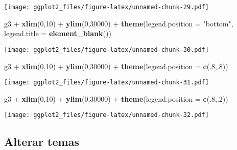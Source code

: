 \documentclass[]{article}
\newenvironment{Shaded}{\begin{snugshade}}{\end{snugshade}}
\newcommand{\KeywordTok}[1]{\textcolor[rgb]{0.13,0.29,0.53}{\textbf{{#1}}}}
\newcommand{\DataTypeTok}[1]{\textcolor[rgb]{0.13,0.29,0.53}{{#1}}}
\newcommand{\DecValTok}[1]{\textcolor[rgb]{0.00,0.00,0.81}{{#1}}}
\newcommand{\StringTok}[1]{\textcolor[rgb]{0.31,0.60,0.02}{{#1}}}
\newcommand{\NormalTok}[1]{{#1}}
\begin{document}
\texttt{[image: ggplot2\_files/figure-latex/unnamed-chunk-29.pdf]}

\newpage

\begin{Shaded}
\begin{Highlighting}[]
\NormalTok{g3 +}\StringTok{ }\KeywordTok{xlim}\NormalTok{(}\DecValTok{0}\NormalTok{,}\DecValTok{10}\NormalTok{) +}\StringTok{ }\KeywordTok{ylim}\NormalTok{(}\DecValTok{0}\NormalTok{,}\DecValTok{30000}\NormalTok{) +}\StringTok{ }\KeywordTok{theme}\NormalTok{(}\DataTypeTok{legend.position =} \StringTok{"bottom"}\NormalTok{, }\DataTypeTok{legend.title =} \KeywordTok{element_blank}\NormalTok{())}
\end{Highlighting}
\end{Shaded}

\texttt{[image: ggplot2\_files/figure-latex/unnamed-chunk-30.pdf]}

\newpage

\begin{Shaded}
\begin{Highlighting}[]
\NormalTok{g3 +}\StringTok{ }\KeywordTok{xlim}\NormalTok{(}\DecValTok{0}\NormalTok{,}\DecValTok{10}\NormalTok{) +}\StringTok{ }\KeywordTok{ylim}\NormalTok{(}\DecValTok{0}\NormalTok{,}\DecValTok{30000}\NormalTok{) +}\StringTok{ }\KeywordTok{theme}\NormalTok{(}\DataTypeTok{legend.position =} \KeywordTok{c}\NormalTok{(.}\DecValTok{8}\NormalTok{,.}\DecValTok{8}\NormalTok{))}
\end{Highlighting}
\end{Shaded}

\texttt{[image: ggplot2\_files/figure-latex/unnamed-chunk-31.pdf]}

\newpage

\begin{Shaded}
\begin{Highlighting}[]
\NormalTok{g3 +}\StringTok{ }\KeywordTok{xlim}\NormalTok{(}\DecValTok{0}\NormalTok{,}\DecValTok{10}\NormalTok{) +}\StringTok{ }\KeywordTok{ylim}\NormalTok{(}\DecValTok{0}\NormalTok{,}\DecValTok{30000}\NormalTok{) +}\StringTok{ }\KeywordTok{theme}\NormalTok{(}\DataTypeTok{legend.position =} \KeywordTok{c}\NormalTok{(.}\DecValTok{8}\NormalTok{,.}\DecValTok{2}\NormalTok{))}
\end{Highlighting}
\end{Shaded}

\texttt{[image: ggplot2\_files/figure-latex/unnamed-chunk-32.pdf]}

\newpage

\subsection{Alterar temas}\label{alterar-temas}
\end{document}
